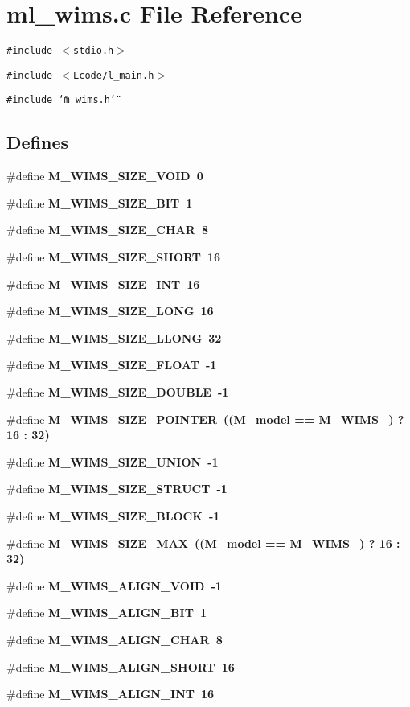 \section{ml\_\-wims.c File Reference}
\label{ml__wims_8c}
{\tt \#include $<$stdio.h$>$}\par
{\tt \#include $<$Lcode/l\_\-main.h$>$}\par
{\tt \#include \char`\"{}m\_\-wims.h\char`\"{}}\par
\subsection*{Defines}
\begin{CompactItemize}
\item 
\#define \bf{M\_\-WIMS\_\-SIZE\_\-VOID}~0
\item 
\#define \bf{M\_\-WIMS\_\-SIZE\_\-BIT}~1
\item 
\#define \bf{M\_\-WIMS\_\-SIZE\_\-CHAR}~8
\item 
\#define \bf{M\_\-WIMS\_\-SIZE\_\-SHORT}~16
\item 
\#define \bf{M\_\-WIMS\_\-SIZE\_\-INT}~16
\item 
\#define \bf{M\_\-WIMS\_\-SIZE\_\-LONG}~16
\item 
\#define \bf{M\_\-WIMS\_\-SIZE\_\-LLONG}~32
\item 
\#define \bf{M\_\-WIMS\_\-SIZE\_\-FLOAT}~-1
\item 
\#define \bf{M\_\-WIMS\_\-SIZE\_\-DOUBLE}~-1
\item 
\#define \bf{M\_\-WIMS\_\-SIZE\_\-POINTER}~((\bf{M\_\-model} == M\_\-WIMS\_) ? 16 : 32)
\item 
\#define \bf{M\_\-WIMS\_\-SIZE\_\-UNION}~-1
\item 
\#define \bf{M\_\-WIMS\_\-SIZE\_\-STRUCT}~-1
\item 
\#define \bf{M\_\-WIMS\_\-SIZE\_\-BLOCK}~-1
\item 
\#define \bf{M\_\-WIMS\_\-SIZE\_\-MAX}~((\bf{M\_\-model} == M\_\-WIMS\_) ? 16 : 32)
\item 
\#define \bf{M\_\-WIMS\_\-ALIGN\_\-VOID}~-1
\item 
\#define \bf{M\_\-WIMS\_\-ALIGN\_\-BIT}~1
\item 
\#define \bf{M\_\-WIMS\_\-ALIGN\_\-CHAR}~8
\item 
\#define \bf{M\_\-WIMS\_\-ALIGN\_\-SHORT}~16
\item 
\#define \bf{M\_\-WIMS\_\-ALIGN\_\-INT}~16
\item 

\end{CompactItemize}
